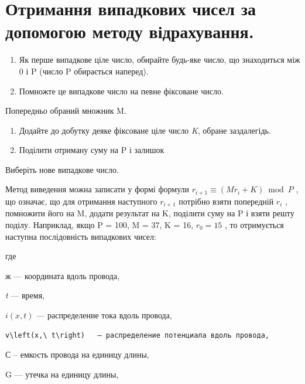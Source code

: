 \documentclass[
  ukrainian,
]{article}
\begin{document}
\section{Отримання випадкових чисел за допомогою методу
відрахування.}\label{ux43eux442ux440ux438ux43cux430ux43dux43dux44f-ux432ux438ux43fux430ux434ux43aux43eux432ux438ux445-ux447ux438ux441ux435ux43b-ux437ux430-ux434ux43eux43fux43eux43cux43eux433ux43eux44e-ux43cux435ux442ux43eux434ux443-ux432ux456ux434ux440ux430ux445ux443ux432ux430ux43dux43dux44f.}

\begin{enumerate}
\def\labelenumi{\arabic{enumi}.}
\item
  Як перше випадкове ціле число, обирайте будь-яке число, що знаходиться
  між 0 і P (число P обирається наперед).
\item
  Помножте це випадкове число на певне фіксоване число.
\end{enumerate}

Попередньо обраний множник M.

\begin{enumerate}
\def\labelenumi{\arabic{enumi}.}
\setcounter{enumi}{2}
\item
  Додайте до добутку деяке фіксоване ціле число \emph{K}, обране
  заздалегідь.
\item
  Поділити отриману суму на P і залишок
\end{enumerate}

Виберіть нове випадкове число.

Метод виведення можна записати у формі формули
\(r_{i+1} \equiv (Mr_i + K) \bmod P\) , що означає, що для отримання
наступного \(r_{i+1}\) потрібно взяти попередній \(r_i\) , помножити
його на M, додати результат на K, поділити суму на P і взяти решту
поділу. Наприклад, якщо P = 100, M = 37, K = 16, \(r_0 = 15\) , то
отримується наступна послідовність випадкових чисел:

где

ж --- координата вдоль провода,

\emph{t} --- время,

\(i(x, t)\) --- распределение тока вдоль провода,

\begin{verbatim}
v\left(x,\ t\right)   — распределение потенциала вдоль провода,
\end{verbatim}

С -- емкость провода на единицу длины,

G --- утечка на единицу длины,
\end{document}
